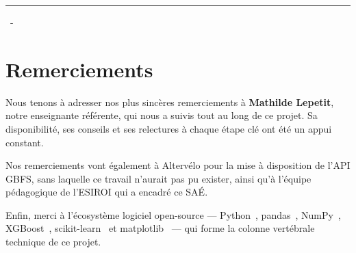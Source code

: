 \documentclass[fleqn, 12pt]{scrartcl}
\newcommand{\ent}{Altervélo\xspace}
\begin{document}
\title{\vspace{-1in}}
\author{}
\date{}
\maketitle

\usebox{\myTitleSignature}
\vspace{1in}

{\centering \huge \myTitle \par}
{\centering \noindent\rule{4in}{0.1pt} \par}
\vspace{0.05in}
{\centering \mySubTitle \mySubSubTitle \par}
\vspace{0.2in}
{\centering \myDate ~-~ \myVersionn \par}
\vspace{1in}


\newpage
\tableofcontents


\newpage

\section*{Remerciements}

Nous tenons à adresser nos plus sincères remerciements à \textbf{Mathilde Lepetit}, notre enseignante référente, qui nous a suivis tout au long de ce projet. Sa disponibilité, ses conseils et ses relectures à chaque étape clé ont été un appui constant.
\vspace{0.5cm}

Nos remerciements vont également à \ent pour la mise à disposition de l'API GBFS, sans laquelle ce travail n'aurait pas pu exister, ainsi qu'à l'équipe pédagogique de l'ESIROI qui a encadré ce SAÉ.
\vspace{0.5cm}

Enfin, merci à l'écosystème logiciel open-source --- Python~\cite{python_2024}, pandas~\cite{pandas_2024}, NumPy~\cite{numpy_2024}, XGBoost~\cite{chen_xgboost_2016}, scikit-learn~\cite{scikit_2024} et matplotlib~\cite{matplotlib_2024} --- qui forme la colonne vertébrale technique de ce projet.


\newpage
\end{document}
